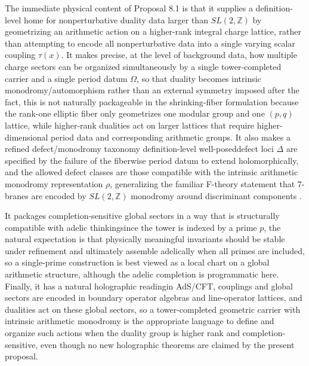 \documentclass[11pt]{article}
\theoremstyle{remark}
\newcommand{\Z}{\mathbb{Z}}
\begin{document}
The immediate physical content of Proposal 8.1 is that it supplies a definition-level home for nonperturbative duality data larger than \(SL(2,\Z)\) by geometrizing an arithmetic action on a higher-rank integral charge lattice, rather than attempting to encode all nonperturbative data into a single varying scalar coupling \(\tau(x)\). It makes precise, at the level of background data, how multiple charge sectors can be organized simultaneously by a single tower-completed carrier and a single period datum \(\Omega\), so that duality becomes intrinsic monodromy/automorphism rather than an external symmetry imposed after the fact, this is not naturally packageable in the shrinking-fiber formulation because the rank-one elliptic fiber only geometrizes one modular group and one \((p,q)\) lattice, while higher-rank dualities act on larger lattices that require higher-dimensional period data and corresponding arithmetic groups. It also makes a refined defect/monodromy taxonomy definition-level well-posed\:defect loci \(\Delta\) are specified by the failure of the fiberwise period datum to extend holomorphically, and the allowed defect classes are those compatible with the intrinsic arithmetic monodromy representation \(\rho\), generalizing the familiar F-theory statement that 7-branes are encoded by \(SL(2,\Z)\) monodromy around discriminant components \cite{Vafa1996}. 

It packages completion-sensitive global sectors in a way that is structurally compatible with adelic thinking\:since the tower is indexed by a prime \(p\), the natural expectation is that physically meaningful invariants should be stable under refinement and ultimately assemble adelically when all primes are included, so a single-prime construction is best viewed as a local chart on a global arithmetic structure, although the adelic completion is programmatic here. Finally, it has a natural holographic reading\:in AdS/CFT, couplings and global sectors are encoded in boundary operator algebras and line-operator lattices, and dualities act on these global sectors, so a tower-completed geometric carrier with intrinsic arithmetic monodromy is the appropriate language to define and organize such actions when the duality group is higher rank and completion-sensitive, even though no new holographic theorems are claimed by the present proposal.
\end{document}
